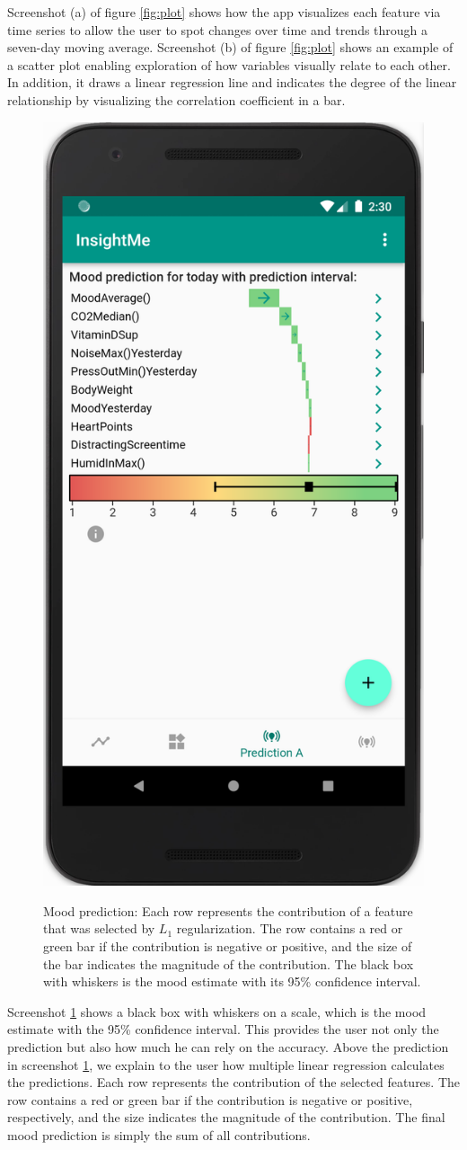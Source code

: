 \documentclass[conference]{IEEEtran}
\begin{document}
Screenshot (a) of figure \ref{fig:plot} shows how the app visualizes each feature via time series to allow the user to spot changes over time and trends through a seven-day moving average.
Screenshot (b) of figure \ref{fig:plot} shows an example of a scatter plot enabling exploration of how variables visually relate to each other. In addition, it draws a linear regression line and indicates the degree of the linear relationship by visualizing the correlation coefficient in a bar.

\begin{figure}[htbp]
    \centering
    \includegraphics[width=0.6\linewidth]{figs/waterfall.png}
    \label{fig:waterfall}
    \caption{Mood prediction: Each row represents the contribution of a feature that was selected by $L_1$ regularization. The row contains a red or green bar if the contribution is negative or positive, and the size of the bar indicates the magnitude of the contribution.
    The black box with whiskers is the mood estimate with its 95\% confidence interval. 
}
\end{figure}
Screenshot \ref{fig:waterfall} shows a black box with whiskers on a scale, which is the mood estimate with the 95\% confidence interval. This provides the user not only the prediction but also how much he can rely on the accuracy.
Above the prediction in screenshot \ref{fig:waterfall}, we explain to the user how multiple linear regression calculates the predictions. Each row represents the contribution of the selected features. The row contains a red or green bar if the contribution is negative or positive, respectively, and the size indicates the magnitude of the contribution. The final mood prediction is simply the sum of all contributions.
\end{document}
